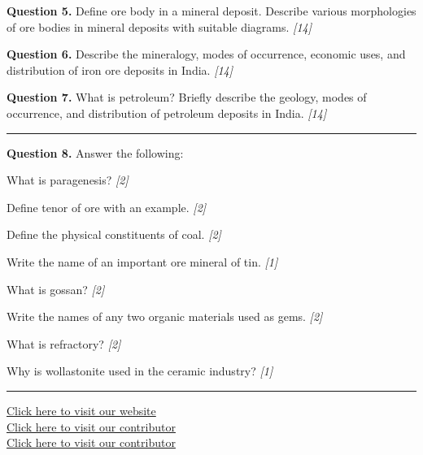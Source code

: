 \documentclass[11pt,a4paper]{article}
\newcommand{\pts}[1]{\hfill   \textit{[#1]}}
\begin{document}
\noindent   \textbf{Question 5.} Define ore body in a mineral deposit. Describe various morphologies of ore bodies in mineral deposits with suitable diagrams. \pts{14}

\medskip


\noindent   \textbf{Question 6.} Describe the mineralogy, modes of occurrence, economic uses, and distribution of iron ore deposits in India. \pts{14}

\medskip


\noindent   \textbf{Question 7.} What is petroleum? Briefly describe the geology, modes of occurrence, and distribution of petroleum deposits in India. \pts{14}

\bigskip


\rule{\linewidth}{0.4pt}\smallskip




\noindent   \textbf{Question 8.} Answer the following:

\begin{parts}
  \item What is paragenesis? \pts{2}
  \item Define tenor of ore with an example. \pts{2}
  \item Define the physical constituents of coal. \pts{2}
  \item Write the name of an important ore mineral of tin. \pts{1}
  \item What is gossan? \pts{2}
  \item Write the names of any two organic materials used as gems. \pts{2}
  \item What is refractory? \pts{2}
  \item Why is wollastonite used in the ceramic industry? \pts{1}
\end{parts}

\vfill\rule{\linewidth}{0.4pt}

\begin{center}\small
\href{https://bhu-exam.vercel.app/}{Click here to visit our website}\\[4pt]
\href{https://me-aryan.vercel.app/}{Click here to visit our contributor}\\[4pt]
\href{https://quashan-me.vercel.app/}{Click here to visit our contributor}
\end{center}
\end{document}
